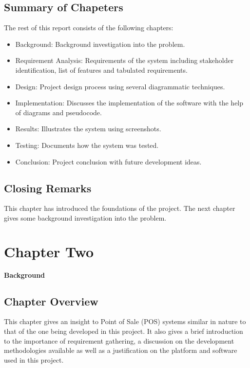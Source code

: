 \documentclass[12pt,a4paper]{article}
\begin{document}
		\subsection{Summary of Chapeters}
		The rest of this report consists of the following chapters: \\
		\begin{itemize}
			\item Background: Background investigation into the problem.
			\item Requirement Analysis: Requirements of the system including stakeholder identification, list of
features and tabulated requirements.
			\item Design: Project design process using several diagrammatic techniques.
			\item Implementation: Discusses the implementation of the software with the help of diagrams and
pseudocode.
			\item Results: Illustrates the system using screenshots.
			\item Testing: Documents how the system was tested.
			\item Conclusion: Project conclusion with future development ideas.
		\end{itemize}
	\subsection{Closing Remarks}
	This chapter has introduced the foundations of the project. The next chapter gives some background
investigation into the problem.


\newpage
\section{Chapter Two}
{\bfseries \Large Background} 
	\subsection{Chapter Overview}
	This chapter gives an insight to Point of Sale (POS) systems similar in nature to that of the one being
developed in this project. It also gives a brief introduction to the importance of requirement gathering,
a discussion on the development methodologies available as well as a justification on the platform and
software used in this project.
\end{document}
